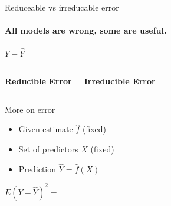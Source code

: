 \documentclass[aspectratio=169,xcolor,dvipsnames]{beamer}
\newcommand{\InstructorNotes}[1]{{\color{orange}#1}}
\newcommand{\InstructorList}[1]{
\begin{itemize}
	\color{orange}
	#1
\end{itemize}
}
\renewcommand{\InstructorNotes}[1]{}
\renewcommand{\InstructorList}[1]{}
\begin{document}
\begin{frame}[t]{Reduceable vs irreducable error}
	\framesubtitle{
	All models are wrong, some are useful.
	}
	\centering

	$Y - \hat Y$

	\begin{columns}
	\centering
	\textbf{Reducible Error}

	\InstructorList{
		\item $\hat f$ will not be a perfect estimate for $f$.
		\item We can potentially improve the irreducible
		accuracy of $\hat f $ by using the most appropriate statistical learning technique 
	}

	\centering

	\textbf{Irreducible Error}

	\InstructorList{
		\item Model was $Y = f(X) + \e$,
		\item Variability of $\e$ also affects predictions
		\item Not matter how well we estimate $f$, we can't get rid of this error.
		\item Would expect this in real life though:
	}
	\end{columns}

\end{frame}
\begin{frame}[t]{More on error}
	\begin{itemize}
		\item
Given estimate $\hat f$ (fixed)
		\item
Set of predictors $X$  (fixed)
		\item
Prediction $\hat Y = \hat f(X)$
	\end{itemize}

\qquad

{
	\Large
	$
		E(Y-\hat Y)^2 =
		\InstructorNotes{E[f(X) + \e -\hat f(X)]^2 = [f(X) - \hat f (X)]^2 + Var(\e)}
		$
}

\InstructorNotes{$[f(X) - \hat f (X)]^2$ is reducible, $Var(\e)$ is irreducible}
\end{frame}
\end{document}
